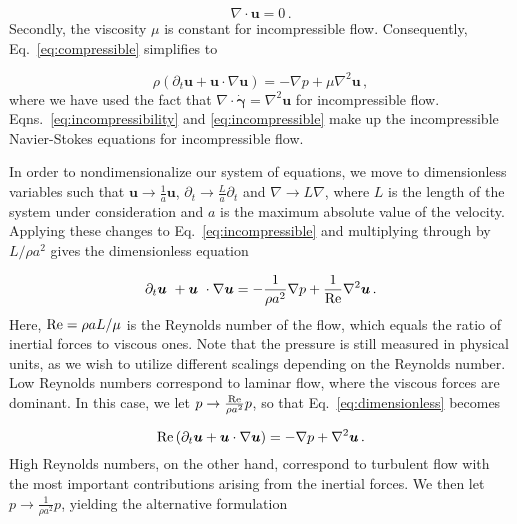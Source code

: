 \documentclass[final,3p,twocolumn]{elsarticle}
\begin{document}
\begin{equation}
    \nabla \cdot \bm{u} = 0 \,.
    \label{eq:incompressibility}
\end{equation}
%
Secondly, the viscosity $\mu$ is constant for incompressible flow.
Consequently, Eq.\ \eqref{eq:compressible} simplifies to 

\begin{equation}
    \rho \left( \partial_t \bm{u} + \bm{u} \cdot \nabla \bm{u} \right) 
    = - \nabla p + \mu \nabla^2 \bm{u} \,,
    \label{eq:incompressible}
\end{equation}
%
where we have used the fact that $\nabla \cdot \dot{\bm{\gamma}} = \nabla^2
\bm{u}$ for incompressible flow. Eqns.\ \eqref{eq:incompressibility} and
\eqref{eq:incompressible} make up the incompressible Navier-Stokes equations
for incompressible flow. 

In order to nondimensionalize our system of equations, we move to dimensionless
variables such that $\bm{u} \rightarrow \frac{1}{a} \bm{u}$, $\partial_t \rightarrow
\frac{L}{a} \partial_t$ and $\nabla \rightarrow L \nabla$, where $L$ is
the length of the system under consideration and $a$ is the maximum absolute
value of the velocity. Applying these changes to Eq.\ \eqref{eq:incompressible}
and multiplying through by $L/\rho a^2$ gives the dimensionless equation 

\begin{equation}
    \partial_t \bm{u} + \bm{u} \cdot \nabla \bm{u} = - \frac{1}{\rho a^2}
    \nabla p + \frac{1}{\rm Re} \nabla^2 \bm{u} \,.
    \label{eq:dimensionless}
\end{equation}
%
Here, ${\rm Re} = \rho a L/\mu$ is the Reynolds number of the flow, which
equals the ratio of inertial forces to viscous ones. Note that the pressure
is still measured in physical units, as we wish to utilize different scalings
depending on the Reynolds number. Low Reynolds numbers correspond to laminar
flow, where the viscous forces are dominant. In this case, we let $p
\rightarrow \frac{\rm Re}{\rho a^2} p$, so that Eq.\ \eqref{eq:dimensionless}
becomes

\begin{equation}
    {\rm Re} \left( \partial_t \bm{u} + \bm{u} \cdot \nabla \bm{u} \right)  = -
    \nabla p + \nabla^2 \bm {u} \,.
    \label{eq:loRe}
\end{equation}
%
High Reynolds numbers, on the other hand, correspond to turbulent flow with the
most important contributions arising from the inertial forces. We then let $p
\rightarrow \frac{1}{\rho a^2} p$, yielding the alternative formulation 
\end{document}
